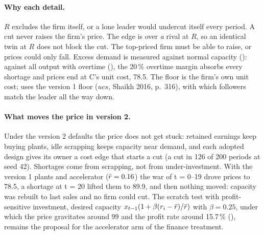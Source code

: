 \paragraph{Why each detail.} $R$ excludes the firm itself, or a lone leader would undercut
itself every period. A cut never raises the firm's price. The edge is over \emph{a} rival at
$R$, so an identical twin at $R$ does not block the cut. The top-priced firm must be able to
raise, or prices could only fall. Excess demand is measured against normal capacity
(): against all output with overtime
(), the 20\,\% overtime margin absorbs every shortage and prices end at
C's unit cost, 78.5. The floor is the firm's own unit cost;  uses the version 1 floor ($ucs$, Shaikh 2016, p.~316), with which
followers match the leader all the way down.

\paragraph{What moves the price in version 2.} Under the version 2 defaults the price does
not get stuck: retained earnings keep buying plants, idle scrapping keeps capacity near
demand, and each adopted design gives its owner a cost edge that starts a cut (a cut in 126
of 200 periods at seed 42). Shortages come from scrapping, not from under-investment. With
the version 1 plants and accelerator ($\bar r = 0.16$) the war of t = 0--19 drove prices to
78.5, a shortage at t = 20 lifted them to 89.9, and then nothing moved: capacity was rebuilt
to last sales and no firm could cut. The scratch test with profit-sensitive investment,
desired capacity $x_{t-1}(1+\beta(r_i-\bar r)/\bar r)$ with $\beta = 0.25$, under which the
price gravitates around 99 and the profit rate around 15.7\,\%
(), remains the proposal for the accelerator arm of the
finance treatment.

